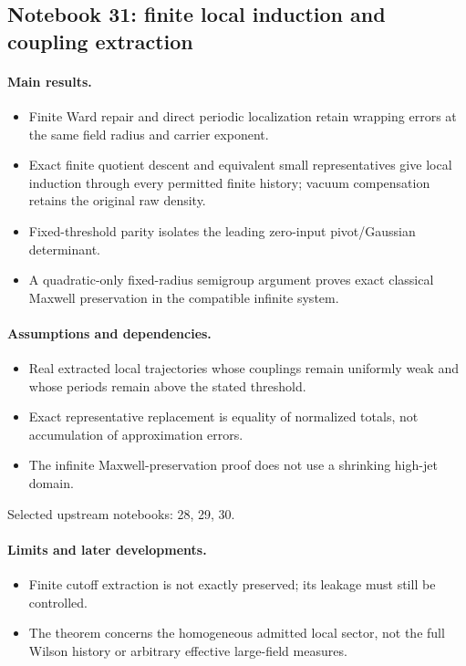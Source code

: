 \subsection{Notebook 31: finite local induction and coupling extraction}
\label{hnc-31}
\noindent{}\par

\paragraph{Main results.}
\begin{itemize}
\item Finite Ward repair and direct periodic localization retain wrapping errors at the same field radius and carrier exponent.
\item Exact finite quotient descent and equivalent small representatives give local induction through every permitted finite history; vacuum compensation retains the original raw density.
\item Fixed-threshold parity isolates the leading zero-input pivot/Gaussian determinant.
\item A quadratic-only fixed-radius semigroup argument proves exact classical Maxwell preservation in the compatible infinite system.
\end{itemize}

\paragraph{Assumptions and dependencies.}
\begin{itemize}
\item Real extracted local trajectories whose couplings remain uniformly weak and whose periods remain above the stated threshold.
\item Exact representative replacement is equality of normalized totals, not accumulation of approximation errors.
\item The infinite Maxwell-preservation proof does not use a shrinking high-jet domain.
\end{itemize}

Selected upstream notebooks: 28, 29, 30.\par

\paragraph{Limits and later developments.}
\begin{itemize}
\item Finite cutoff extraction is not exactly preserved; its leakage must still be controlled.
\item The theorem concerns the homogeneous admitted local sector, not the full Wilson history or arbitrary effective large-field measures.
\end{itemize}

